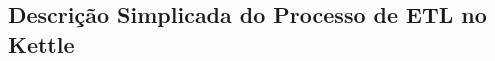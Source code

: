 \begin{apendicesenv}



\chapter{Descrição Simplicada do Processo de ETL no Kettle}

\label{implementação}


\end{apendicesenv}
